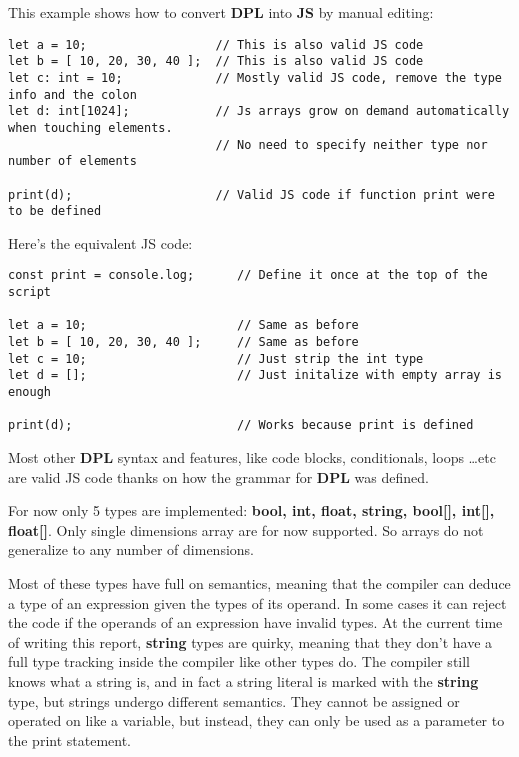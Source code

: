 \documentclass[a4paper]{article}
\begin{document}
This example shows how to convert \textbf{DPL} into \textbf{JS} by manual editing:

\begin{lstlisting}[language=DPL]
let a = 10;                  // This is also valid JS code
let b = [ 10, 20, 30, 40 ];  // This is also valid JS code
let c: int = 10;             // Mostly valid JS code, remove the type info and the colon
let d: int[1024];            // Js arrays grow on demand automatically when touching elements.
                             // No need to specify neither type nor number of elements

print(d);                    // Valid JS code if function print were to be defined
\end{lstlisting}

Here's the equivalent JS code:

\begin{lstlisting}[language=JS]
const print = console.log;      // Define it once at the top of the script

let a = 10;                     // Same as before
let b = [ 10, 20, 30, 40 ];     // Same as before
let c = 10;                     // Just strip the int type
let d = [];                     // Just initalize with empty array is enough

print(d);                       // Works because print is defined
\end{lstlisting}

Most other \textbf{DPL} syntax and features, like code blocks, conditionals, loops \dots etc are valid JS code
thanks on how the grammar for \textbf{DPL} was defined.

For now only 5 types are implemented: \textbf{bool, int, float, string, bool[], int[], float[]}.
Only single dimensions array are for now supported. So arrays do not generalize to any number of dimensions.

Most of these types have full on semantics, meaning that the compiler can deduce
a type of an expression given the types of its operand. In some cases it can reject
the code if the operands of an expression have invalid types.
At the current time of writing this report, \textbf{string} types are quirky, meaning that
they don't have a full type tracking inside
the compiler like other types do.
The compiler still knows what a string is, and in fact a string literal is marked
with the \textbf{string} type, but strings undergo different semantics.
They cannot be assigned or operated on like a variable, but instead,
they can only be used as a parameter to the print statement.
\end{document}
